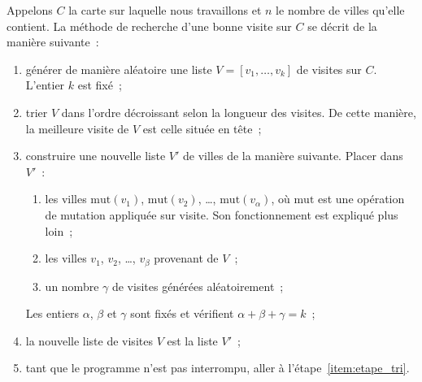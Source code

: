 \documentclass[12pt]{article}
\theoremstyle{definition}
\newcommand{\Mut}{\mathrm{mut}}
\begin{document}
Appelons $C$ la carte sur laquelle nous travaillons et $n$ le nombre de
villes qu'elle contient. La méthode de recherche d'une bonne visite sur
$C$ se décrit de la manière suivante~:
\begin{enumerate}
    \item générer de manière aléatoire une liste $V = [v_1, \dots, v_k]$
    de visites sur $C$. L'entier $k$ est fixé~;
    \smallskip

    \item \label{item:etape_tri}
    trier $V$ dans l'ordre décroissant selon la longueur des visites.
    De cette manière, la meilleure visite de $V$ est celle située en
    tête~;
    \smallskip

    \item construire une nouvelle liste $V'$ de villes de la manière
    suivante. Placer dans $V'$~:
    \begin{enumerate}
        \item les villes $\Mut(v_1)$, $\Mut(v_2)$, \dots,
        $\Mut(v_{\alpha})$, où $\Mut$ est une opération de mutation
        appliquée sur visite. Son fonctionnement est expliqué plus loin~;
        \item les villes $v_1$, $v_2$, \dots, $v_\beta$ provenant de $V$~;
        \item un nombre $\gamma$ de visites générées aléatoirement~;
    \end{enumerate}
    Les entiers $\alpha$, $\beta$ et $\gamma$ sont fixés et vérifient
    $\alpha + \beta + \gamma = k$~;
    \smallskip

    \item la nouvelle liste de visites $V$ est la liste $V'$~;
    \smallskip

    \item tant que le programme n'est pas interrompu, aller à
    l'étape~\ref{item:etape_tri}.
\end{enumerate}
\medskip
\end{document}
